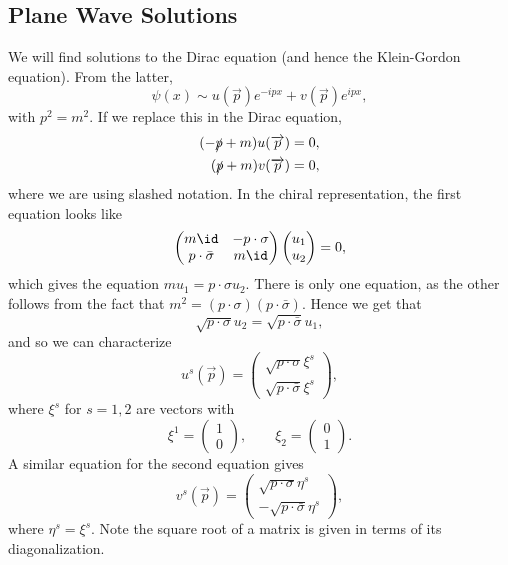\documentclass[12pt]{article}
\begin{document}
\subsection{Plane Wave Solutions}%
\label{sub:pws}

We will find solutions to the Dirac equation (and hence the Klein-Gordon equation). From the latter,
\[
\psi(x) \sim u(\overrightarrow p) e^{-ipx} + v(\overrightarrow p) e^{ipx},
\]
with $p^2 = m^2$. If we replace this in the Dirac equation,
\begin{align*}
	(- \slashed{p} + m) u(\overrightarrow p) &= 0, \\
	(\slashed{p} + m) v(\overrightarrow p) &= 0,
\end{align*}
where we are using slashed notation. In the chiral representation, the first equation looks like
\begin{align*}
	\begin{pmatrix}
		m \id & - p \cdot \sigma \\
		p \cdot \bar\sigma & m \id
	\end{pmatrix}
	\begin{pmatrix}
		u_1 \\ u_2
	\end{pmatrix}
	= 0,
\end{align*}
which gives the equation $m u_1 = p \cdot \sigma u_2$. There is only one equation, as the other follows from the fact that $m^2 = (p \cdot \sigma)(p \cdot \bar \sigma)$. Hence we get that
\[
	\sqrt{p \cdot \sigma} u_2 = \sqrt{p \cdot \bar \sigma} u_1,
\]
and so we can characterize
\[
u^{s}(\overrightarrow p) =
\begin{pmatrix}
	\sqrt{p \cdot \sigma} \xi^{s} \\
	\sqrt{p \cdot \bar \sigma} \xi^{s}
\end{pmatrix},
\]
where $\xi^{s}$ for $s = 1, 2$ are vectors with
\[
\xi^1 =
\begin{pmatrix}
	1 \\ 0
\end{pmatrix}, \qquad \xi_2 =
\begin{pmatrix}
	0 \\ 1
\end{pmatrix}.
\]
A similar equation for the second equation gives
\[
	v^{s}(\overrightarrow p) =
	\begin{pmatrix}
		\sqrt{p \cdot \sigma} \eta^s \\
		- \sqrt{p \cdot \bar \sigma} \eta^s
	\end{pmatrix},
\]
where $\eta^s = \xi^s$. Note the square root of a matrix is given in terms of its diagonalization.
\end{document}
